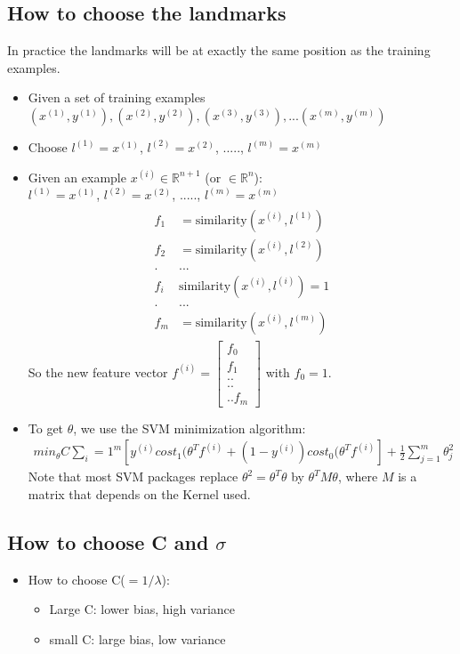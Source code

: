 \documentclass[a4paper,12pt]{report}
\begin{document}
\subsection{How to choose the landmarks}
In practice the landmarks will be at exactly the same position as the training examples.
\begin{itemize}
\item Given a set of training examples $(x^{(1)}, y^{(1)}), (x^{(2)}, y^{(2)}), (x^{(3)}, y^{(3)}), ...(x^{(m)}, y^{(m)}) $
\item Choose $l^{(1)}=x^{(1)}$, $l^{(2)}=x^{(2)}$, ....., $l^{(m)}=x^{(m)}$
\item Given an example $x^{(i)} \in \mathbb{R}^{n+1}$ (or $\in \mathbb{R}^n$):\\
 $l^{(1)}=x^{(1)}$, $l^{(2)}=x^{(2)}$, ....., $l^{(m)}=x^{(m)}$
\begin{align}
\begin{split}
f_1 &= \text{similarity} (x^{(i)}, l^{(1)})\\
f_2 &= \text{similarity} (x^{(i)}, l^{(2)})\\
. & ...\\
f_i & \text{similarity} (x^{(i)}, l^{(i)}) = 1 \\
. & ...\\
f_m &= \text{similarity} (x^{(i)}, l^{(m)})
\end{split}
\end{align}
So the new feature vector $f^{(i)}=\left[ \begin{smallmatrix} f_0 \\ f_1 \\..\\..\\.. f_m \end{smallmatrix}\right]$ with $f_0 =1$. \\
\item To get $\theta$, we use the SVM minimization algorithm:
\begin{align}
min_{\theta} C \sum_i=1 ^{m} \left[ y^{(i)} cost_1(\theta^T f^{(i)} + (1-y^{(i)}) cost_0(\theta^T f^{(i)} \right] + \frac{1}{2}\sum_{j=1} ^m \theta_j^2
\end{align}
Note that most SVM packages replace $\theta^2 = \theta^T \theta$ by $\theta^T M \theta$, where $M$ is a matrix that depends on the Kernel used.
\end{itemize}

\subsection{How to choose C and $\sigma$}
\begin{itemize}
\item How to choose C($=1/\lambda$):
\begin{itemize}
\item Large C: lower bias, high variance
\item small C: large bias, low variance
\end{itemize}
\end{itemize}
\end{document}
